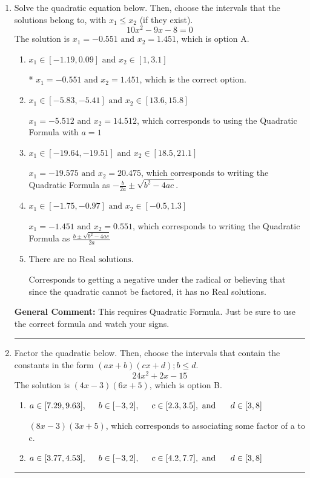 \documentclass{extbook}[14pt]
\newcommand{\litem}[1]{\item #1

\rule{\textwidth}{0.4pt}}
\begin{document}
\begin{enumerate}\litem{
Solve the quadratic equation below. Then, choose the intervals that the solutions belong to, with $x_1 \leq x_2$ (if they exist).
\[ 10x^{2} -9 x -8 = 0 \]The solution is \( x_1 = -0.551 \text{ and } x_2 = 1.451 \), which is option A.\begin{enumerate}[label=\Alph*.]
\item \( x_1 \in [-1.19, 0.09] \text{ and } x_2 \in [1, 3.1] \)

* $x_1 = -0.551 \text{ and } x_2 = 1.451$, which is the correct option.
\item \( x_1 \in [-5.83, -5.41] \text{ and } x_2 \in [13.6, 15.8] \)

 $x_1 = -5.512 \text{ and } x_2 = 14.512$, which corresponds to using the Quadratic Formula with $a=1$
\item \( x_1 \in [-19.64, -19.51] \text{ and } x_2 \in [18.5, 21.1] \)

 $x_1 = -19.575 \text{ and } x_2 = 20.475$, which corresponds to writing the Quadratic Formula as $-\frac{b}{2a} \pm \sqrt{b^2 - 4ac}$.
\item \( x_1 \in [-1.75, -0.97] \text{ and } x_2 \in [-0.5, 1.3] \)

 $x_1 = -1.451 \text{ and } x_2 = 0.551$, which corresponds to writing the Quadratic Formula as $\frac{b \pm \sqrt{b^2 - 4ac}}{2a}$
\item \( \text{There are no Real solutions.} \)

Corresponds to getting a negative under the radical or believing that since the quadratic cannot be factored, it has no Real solutions.
\end{enumerate}

\textbf{General Comment:} This requires Quadratic Formula. Just be sure to use the correct formula and watch your signs.
}
\litem{
Factor the quadratic below. Then, choose the intervals that contain the constants in the form $(ax+b)(cx+d); b \leq d.$
\[ 24x^{2} +2 x -15 \]The solution is \( (4x -3)(6x + 5) \), which is option B.\begin{enumerate}[label=\Alph*.]
\item \( a \in [7.29, 9.63], \hspace*{5mm} b \in [-3, 2], \hspace*{5mm} c \in [2.3, 3.5], \text{ and } \hspace*{5mm} d \in [3, 8] \)

 $(8x -3)(3x + 5)$, which corresponds to associating some factor of a to c.
\item \( a \in [3.77, 4.53], \hspace*{5mm} b \in [-3, 2], \hspace*{5mm} c \in [4.2, 7.7], \text{ and } \hspace*{5mm} d \in [3, 8] \)


\end{enumerate}}
\end{enumerate}
\end{document}
